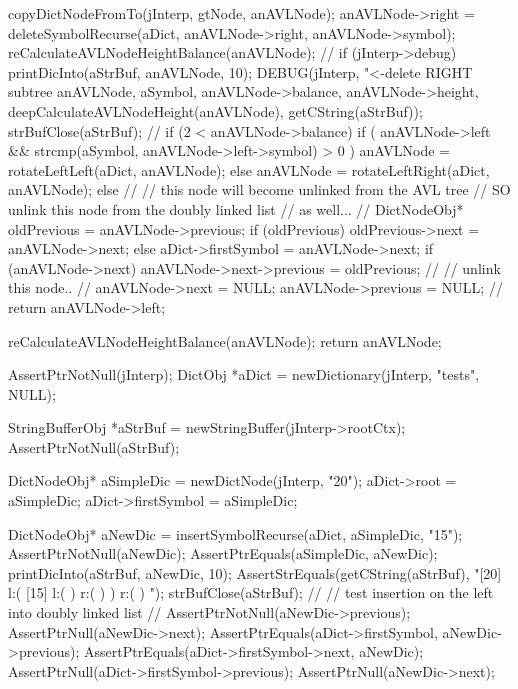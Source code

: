 {{{{      }
      copyDictNodeFromTo(jInterp, gtNode, anAVLNode);
      anAVLNode->right =
        deleteSymbolRecurse(aDict, anAVLNode->right, anAVLNode->symbol);
      reCalculateAVLNodeHeightBalance(anAVLNode);
      //
      if (jInterp->debug) {
        printDicInto(aStrBuf, anAVLNode, 10);
        DEBUG(jInterp, "<-delete RIGHT subtree %
            anAVLNode, aSymbol, anAVLNode->balance,
            anAVLNode->height, deepCalculateAVLNodeHeight(anAVLNode),
            getCString(aStrBuf));
        strBufClose(aStrBuf);
      }
      //
      if (2 < anAVLNode->balance) {
        if (
          anAVLNode->left &&
          strcmp(aSymbol, anAVLNode->left->symbol) > 0
          ) {
          anAVLNode = rotateLeftLeft(aDict, anAVLNode);
        } else {
          anAVLNode = rotateLeftRight(aDict, anAVLNode);
        }
      }
    } else {
      //
      // this node will become unlinked from the AVL tree
      // SO unlink this node from the doubly linked list
      // as well...
      //
      DictNodeObj* oldPrevious           = anAVLNode->previous;
      if (oldPrevious) oldPrevious->next = anAVLNode->next;
      else aDict->firstSymbol            = anAVLNode->next;
      if (anAVLNode->next) {
        anAVLNode->next->previous        = oldPrevious;
      }
      //
      // unlink this node..
      //
      anAVLNode->next     = NULL;
      anAVLNode->previous = NULL;
      //
      return anAVLNode->left;
    }
  }

  reCalculateAVLNodeHeightBalance(anAVLNode);
  return anAVLNode;
}
\stopCCode

\startCTest
  AssertPtrNotNull(jInterp);
  DictObj *aDict = newDictionary(jInterp, "tests", NULL);

  StringBufferObj *aStrBuf = newStringBuffer(jInterp->rootCtx);
  AssertPtrNotNull(aStrBuf);
  
  DictNodeObj* aSimpleDic = newDictNode(jInterp, "20");
  aDict->root             = aSimpleDic;
  aDict->firstSymbol      = aSimpleDic;

  DictNodeObj* aNewDic = insertSymbolRecurse(aDict, aSimpleDic, "15");
  AssertPtrNotNull(aNewDic);
  AssertPtrEquals(aSimpleDic, aNewDic);
  printDicInto(aStrBuf, aNewDic, 10);
  AssertStrEquals(getCString(aStrBuf),
  "[20] l:( [15] l:(  ) r:(  )  ) r:(  ) ");
  strBufClose(aStrBuf);
  //
  // test insertion on the left into doubly linked list
  //
  AssertPtrNotNull(aNewDic->previous);
  AssertPtrNull(aNewDic->next);
  AssertPtrEquals(aDict->firstSymbol, aNewDic->previous);
  AssertPtrEquals(aDict->firstSymbol->next, aNewDic);
  AssertPtrNull(aDict->firstSymbol->previous);
  AssertPtrNull(aNewDic->next);

